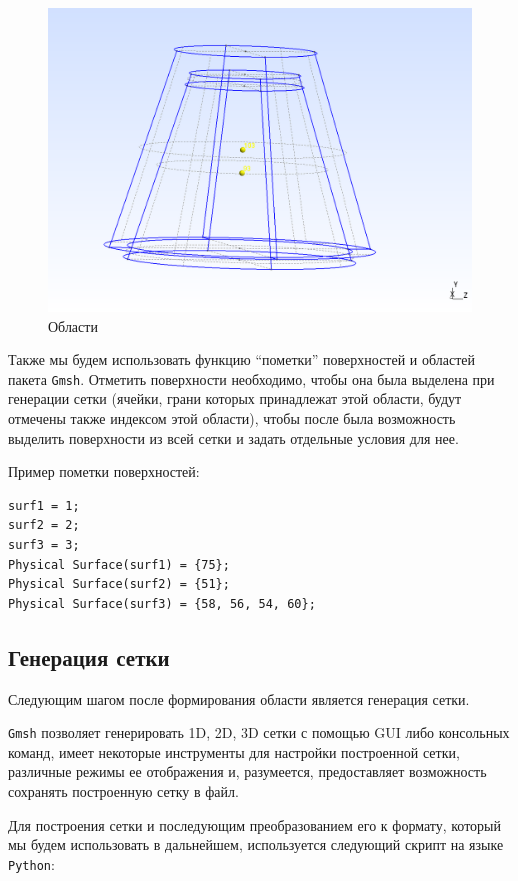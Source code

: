 \documentclass[a4paper, 14pt]{extreport}
\begin{document}
\begin{figure}[H]
	\center
	\includegraphics[scale=0.4]{pictures/volumes.png}
	\caption{Области}
	\label{fig: volumes}
\end{figure}

Также мы будем использовать функцию \enquote{пометки} поверхностей и областей пакета \texttt{Gmsh}. Отметить поверхности необходимо, чтобы она была выделена при генерации сетки (ячейки, грани которых принадлежат этой области, будут отмечены также индексом этой области), чтобы после была возможность выделить поверхности из всей сетки и задать отдельные условия для нее.

Пример пометки поверхностей:
\begin{lstlisting}
surf1 = 1;
surf2 = 2;
surf3 = 3;
Physical Surface(surf1) = {75};
Physical Surface(surf2) = {51};
Physical Surface(surf3) = {58, 56, 54, 60};
\end{lstlisting}

\subsection{Генерация сетки}

Следующим шагом после формирования области является генерация сетки.

\texttt{Gmsh} позволяет генерировать 1D, 2D, 3D сетки с помощью 
GUI либо консольных команд, имеет некоторые инструменты
для настройки построенной сетки, различные режимы ее отображения
и, разумеется, предоставляет возможность сохранять построенную сетку в файл.

Для построения сетки и последующим преобразованием его к 
формату, который 
мы будем использовать в дальнейшем, используется следующий  
скрипт на языке \texttt{Python}:
\end{document}
